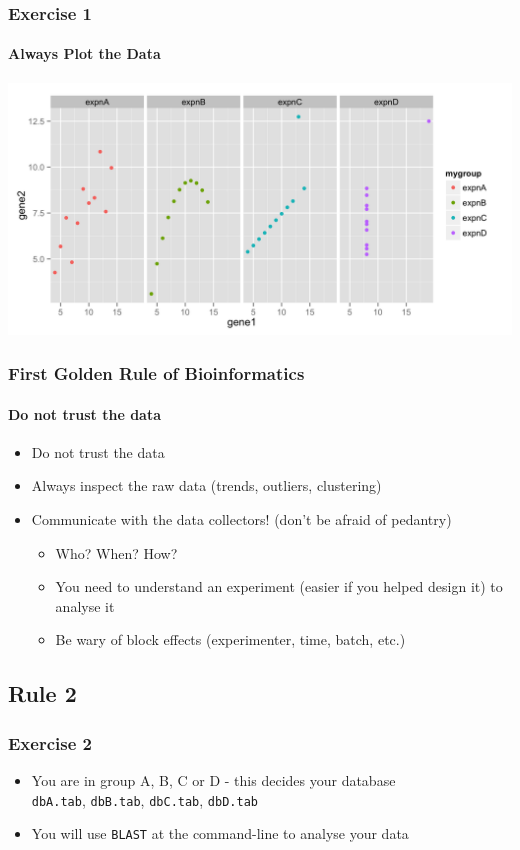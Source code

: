 \documentclass[table]{beamer}
\begin{document}
  \begin{frame}
    \frametitle{Exercise 1}
    \framesubtitle{Always Plot the Data}
    \begin{center}
      \includegraphics[width=\textwidth]{images/ex1_rplot} \\
    \end{center}
  \end{frame}

  \begin{frame}
    \frametitle{First Golden Rule of Bioinformatics}
    \framesubtitle{Do not trust the data}
	\begin{itemize}
	  \item Do not trust the data
	  \item Always inspect the raw data (trends, outliers, clustering)
	  \item Communicate with the data collectors! (don't be afraid of pedantry)
	  \begin{itemize}
	    \item Who? When? How?
	    \item You need to understand an experiment (easier if you helped design it) to analyse it
	    \item Be wary of block effects (experimenter, time, batch, etc.)
	  \end{itemize}
	\end{itemize}
  \end{frame}

  \subsection{Rule 2}
  \begin{frame}
    \frametitle{Exercise 2}
    \begin{itemize}
      \item You are in group A, B, C or D - this decides your database\\
      \texttt{dbA.tab}, \texttt{dbB.tab}, \texttt{dbC.tab}, \texttt{dbD.tab}
      \item You will use \texttt{BLAST} at the command-line to analyse your data
    \end{itemize}
  \end{frame}
\end{document}
